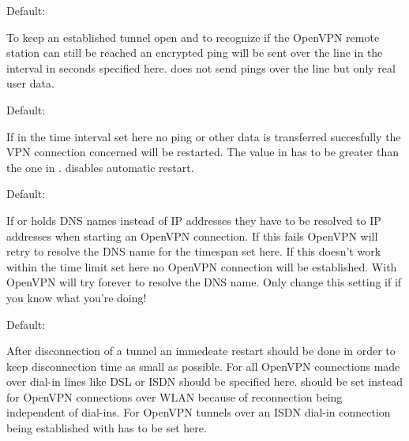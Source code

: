 \begin{description}
  Default: 

  To keep an established tunnel open and to recognize if the OpenVPN remote 
  station can still be reached an encrypted ping will be sent over the line 
  in the interval in seconds specified here.  does not send pings 
  over the line but only real user data.


  Default: 

  If in the time interval set here no ping or other data is transferred 
  succesfully the VPN connection concerned will be restarted. The value 
  in  has to be greater than the 
  one in .  disables automatic 
  restart.


  Default: 

  If  or  
  holds DNS names instead of IP addresses they have to be resolved 
  to IP addresses when starting an OpenVPN connection. If this fails 
  OpenVPN will retry to resolve the DNS name for the timespan set here. 
  If this doesn't work within the time limit set here no OpenVPN 
  connection will be established. With  OpenVPN will 
  try forever to resolve the DNS name. Only change this setting if 
  if you know what you're doing!


  Default: 

  After disconnection of a tunnel an immedeate restart should be done 
  in order to keep disconnection time as small as possible. For all OpenVPN 
  connections made over dial-in lines like DSL or ISDN  should 
  be specified here.  should be set instead for OpenVPN connections 
  over WLAN because of reconnection being independent of dial-ins. 
  For OpenVPN tunnels over an ISDN dial-in connection being established 
  with   has to be set here.



\end{description}
